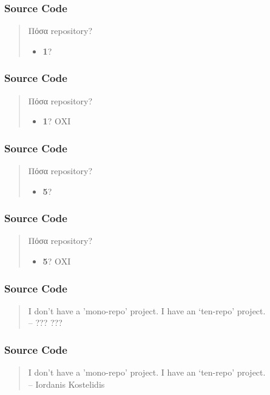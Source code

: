 \documentclass{beamer}
\begin{document}
\begin{frame}
\frametitle{Source Code}
\begin{quote}
Πόσα repository?
\begin{itemize}
    \item \textbf{1}?
\end{itemize}
\end{quote}
\end{frame}

\begin{frame}
\frametitle{Source Code}
\begin{quote}
Πόσα repository?
\begin{itemize}
    \item \textbf{1}? ΟΧΙ
\end{itemize}
\end{quote}
\end{frame}

\begin{frame}
\frametitle{Source Code}
\begin{quote}
Πόσα repository?
\begin{itemize}
    \item \textbf{5}?
\end{itemize}
\end{quote}
\end{frame}

\begin{frame}
\frametitle{Source Code}
\begin{quote}
Πόσα repository?
\begin{itemize}
    \item \textbf{5}? ΟΧΙ
\end{itemize}
\end{quote}
\end{frame}

\begin{frame}
\frametitle{Source Code}
\begin{quote}
I don’t have a 'mono-repo' project. I have an ‘ten-repo’ project.
\\ \hfill -- ??? ???
\end{quote}
\end{frame}

\begin{frame}
\frametitle{Source Code}
\begin{quote}
I don’t have a 'mono-repo' project. I have an ‘ten-repo’ project.
\\ \hfill -- Iordanis Kostelidis
\end{quote}
\end{frame}
\end{document}
